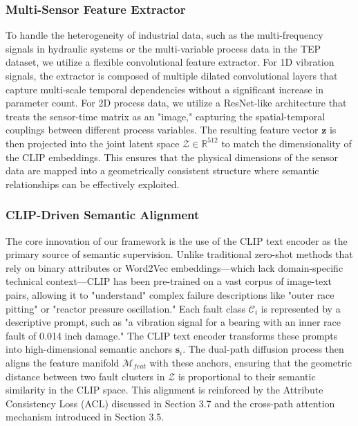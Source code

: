 \subsubsection{Multi-Sensor Feature Extractor}
To handle the heterogeneity of industrial data, such as the multi-frequency signals in hydraulic systems or the multi-variable process data in the TEP dataset, we utilize a flexible convolutional feature extractor. For 1D vibration signals, the extractor is composed of multiple dilated convolutional layers that capture multi-scale temporal dependencies without a significant increase in parameter count. For 2D process data, we utilize a ResNet-like architecture that treats the sensor-time matrix as an "image," capturing the spatial-temporal couplings between different process variables. The resulting feature vector $\mathbf{z}$ is then projected into the joint latent space $\mathcal{Z} \in \mathbb{R}^{512}$ to match the dimensionality of the CLIP embeddings. This ensures that the physical dimensions of the sensor data are mapped into a geometrically consistent structure where semantic relationships can be effectively exploited.

\subsubsection{CLIP-Driven Semantic Alignment}
The core innovation of our framework is the use of the CLIP text encoder as the primary source of semantic supervision. Unlike traditional zero-shot methods that rely on binary attributes or Word2Vec embeddings—which lack domain-specific technical context—CLIP has been pre-trained on a vast corpus of image-text pairs, allowing it to "understand" complex failure descriptions like "outer race pitting" or "reactor pressure oscillation." Each fault class $\mathcal{C}_i$ is represented by a descriptive prompt, such as "a vibration signal for a bearing with an inner race fault of 0.014 inch damage." The CLIP text encoder transforms these prompts into high-dimensional semantic anchors $\mathbf{s}_i$. The dual-path diffusion process then aligns the feature manifold $\mathcal{M}_{feat}$ with these anchors, ensuring that the geometric distance between two fault clusters in $\mathcal{Z}$ is proportional to their semantic similarity in the CLIP space. This alignment is reinforced by the Attribute Consistency Loss (ACL) discussed in Section 3.7 and the cross-path attention mechanism introduced in Section 3.5.

